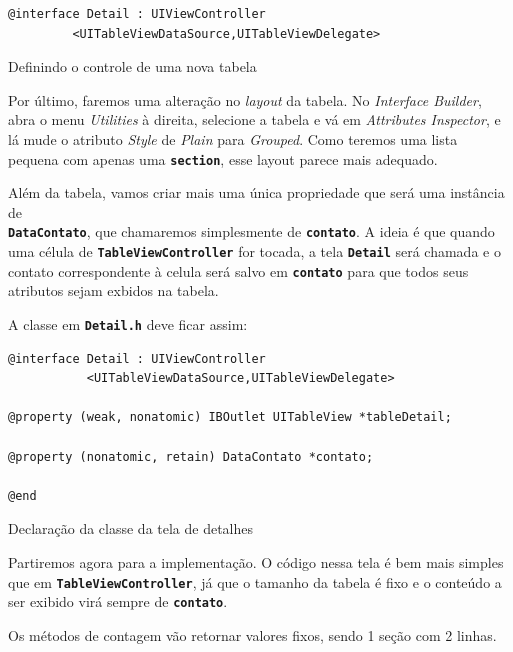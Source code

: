 \documentclass[a4paper,12pt,brazil,doubleside]{book}
\begin{document}
\begin{singlespace}
\begin{listing}[H]
\begin{verbatim}
@interface Detail : UIViewController
         <UITableViewDataSource,UITableViewDelegate>
\end{verbatim}
\caption{Definindo o controle de uma nova tabela}
\end{listing}


Por último, faremos uma alteração no \emph{layout} da tabela. No \emph{Interface Builder}, abra o menu \emph{Utilities} à direita, selecione a tabela e vá em \emph{Attributes Inspector}, e lá mude o atributo \emph{Style} de \emph{Plain} para \emph{Grouped}. Como teremos uma lista pequena com apenas uma \texttt{\textbf{section}}, esse layout parece mais adequado.

Além da tabela, vamos criar mais uma única propriedade que será uma instância de\\
\texttt{\textbf{DataContato}}, que chamaremos simplesmente de \texttt{\textbf{contato}}. A ideia é que quando uma célula de \texttt{\textbf{TableViewController}} for tocada, a tela \texttt{\textbf{Detail}} será chamada e o contato correspondente à celula será salvo em \texttt{\textbf{contato}} para que todos seus atributos sejam exbidos na tabela.

A classe em \texttt{\textbf{Detail.h}} deve ficar assim:

\begin{listing}[H]
\begin{verbatim}
@interface Detail : UIViewController
           <UITableViewDataSource,UITableViewDelegate>

@property (weak, nonatomic) IBOutlet UITableView *tableDetail;

@property (nonatomic, retain) DataContato *contato;

@end
\end{verbatim}
\caption{Declaração da classe da tela de detalhes}
\end{listing}


Partiremos agora para a implementação. O código nessa tela é bem mais simples que em \texttt{\textbf{TableViewController}}, já que o tamanho da tabela é fixo e o conteúdo a ser exibido virá sempre de \texttt{\textbf{contato}}.

Os métodos de contagem vão retornar valores fixos, sendo 1 seção com 2 linhas.


\end{singlespace}
\end{document}
